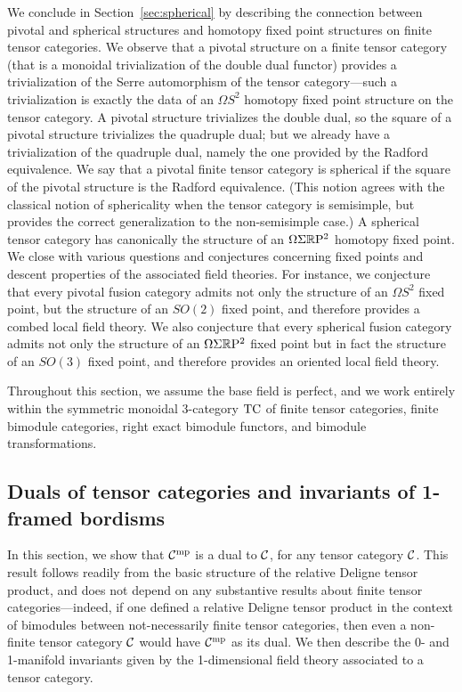 \documentclass{amsart}
\begin{document}
We conclude in Section~\ref{sec:spherical} by describing the connection between pivotal and spherical structures and homotopy fixed point structures on finite tensor categories.  We observe that a pivotal structure on a finite tensor category (that is a monoidal trivialization of the double dual functor) provides a trivialization of the Serre automorphism of the tensor category---such a trivialization is exactly the data of an $\Omega S^2$ homotopy fixed point structure on the tensor category.  A pivotal structure trivializes the double dual, so the square of a pivotal structure trivializes the quadruple dual; but we already have a trivialization of the quadruple dual, namely the one provided by the Radford equivalence.  We say that a pivotal finite tensor category is spherical if the square of the pivotal structure is the Radford equivalence.  (This notion agrees with the classical notion of sphericality when the tensor category is semisimple, but provides the correct generalization to the non-semisimple case.)  A spherical tensor category has canonically the structure of an $\Omega \Sigma \mathbb R \mathrm{P}^2$ homotopy fixed point.  We close with various questions and conjectures concerning fixed points and descent properties of the associated field theories.  For instance, we conjecture that every pivotal fusion category admits not only the structure of an $\Omega S^2$ fixed point, but the structure of an $SO(2)$ fixed point, and therefore provides a combed local field theory.  We also conjecture that every spherical fusion category admits not only the structure of an $\Omega \Sigma \mathbb R \mathrm{P}^2$ fixed point but in fact the structure of an $SO(3)$ fixed point, and therefore provides an oriented local field theory.

Throughout this section, we assume the base field is perfect, and we work entirely within the symmetric monoidal 3-category $\mathrm{TC}$ of finite tensor categories, finite bimodule categories, right exact bimodule functors, and bimodule transformations.



\subsection{Duals of tensor categories and invariants of 1-framed bordisms} \label{sec:df-objects}


In this section, we show that $\mathcal C^{\mathrm{mp}}$ is a dual to $\mathcal C$, for any tensor category $\mathcal C$.  This result follows readily from the basic structure of the relative Deligne tensor product, and does not depend on any substantive results about finite tensor categories---indeed, if one defined a relative Deligne tensor product in the context of bimodules between not-necessarily finite tensor categories, then even a non-finite tensor category $\mathcal C$ would have $\mathcal C^{\mathrm{mp}}$ as its dual.  We then describe the 0- and 1-manifold invariants given by the 1-dimensional field theory associated to a tensor category.
\end{document}
